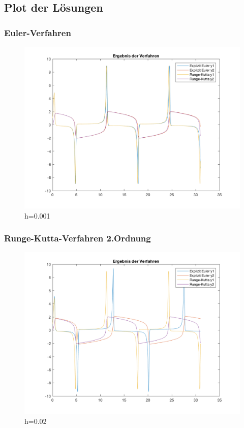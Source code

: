 \documentclass[]{scrartcl}
\begin{document}
\subsection{Plot der Lösungen}
\subsubsection{Euler-Verfahren}
\begin{figure}[htbp]
\centering
\includegraphics[width=1\linewidth]{a1_2_1}
\caption{h=0.001}
\label{fig:a1_2_1}
\end{figure}


\subsubsection{Runge-Kutta-Verfahren 2.Ordnung}
\begin{figure}[htbp]
	\centering
	\includegraphics[width=1\linewidth]{a1_2_2}
	\caption{h=0.02}
	\label{fig:a1_2_2}
\end{figure}
\end{document}
